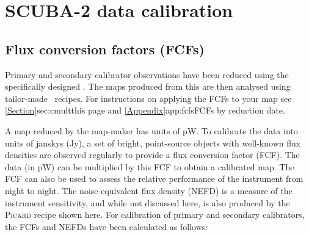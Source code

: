 \chapter{SCUBA-2 data calibration}
\label{app:cal}

\section{Flux conversion factors (FCFs)}
\label{app:fcf}

Primary and secondary calibrator observations have been reduced using
the specifically designed .  The
maps produced from this are then analysed using tailor-made \picard\
recipes. For instructions on applying the FCFs to your map see
\cref{Section}{sec:cmult}{this page} and
\cref{Appendix}{app:fcfs}{FCFs by reduction date}.

A map reduced by the map-maker has units of pW. To calibrate the data
into units of janskys (Jy), a set of bright, point-source objects with
well-known flux densities are observed regularly to provide a flux
conversion factor (FCF). The data (in pW) can be multiplied by this
FCF to obtain a calibrated map. The FCF can also be used to assess the
relative performance of the instrument from night to night. The noise
equivalent flux density (NEFD) is a measure of the instrument
sensitivity, and while not discussed here, is also produced by the
\textsc{Picard} recipe shown here. For calibration of primary and
secondary calibrators, the FCFs and NEFDs have been calculated as
follows:

